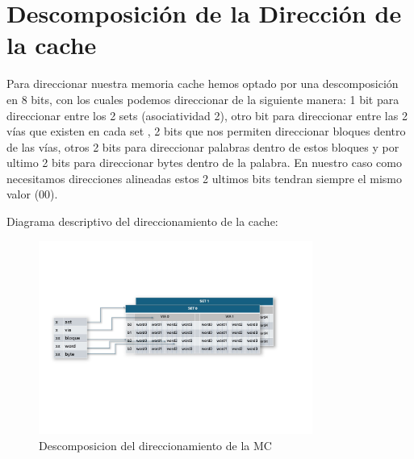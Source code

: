 \documentclass{article}
\begin{document}


\newpage

\section{Descomposición de la Dirección de la cache}
Para direccionar nuestra memoria cache hemos optado por una descomposición en 8 bits, con los cuales podemos direccionar de la siguiente manera: 1 bit para direccionar entre los 2 sets (asociatividad 2), otro bit para direccionar entre las 2 vías que existen en cada set
, 2 bits que nos permiten direccionar bloques dentro de las vías, otros 2 bits para direccionar palabras dentro de estos bloques y por ultimo 2 bits para direccionar bytes dentro de la palabra. En nuestro caso como necesitamos direcciones alineadas estos 2 ultimos bits 
tendran siempre el mismo valor (00).\par
Diagrama descriptivo del direccionamiento de la cache:\par

\begin{figure}[htbp]
  \centering
  \includegraphics[page=1, width=0.8\textwidth, clip]{assets/Descomposicion_Direcciones_light.png}
  \caption{Descomposicion del direccionamiento de la MC}
  \label{fig:imagen}
\end{figure}
\end{document}
